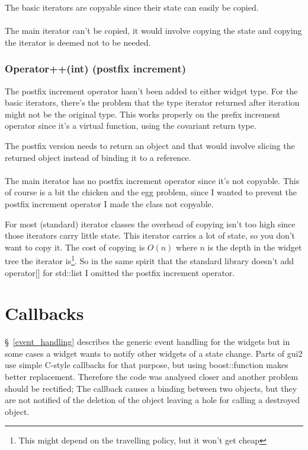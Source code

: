 \documentclass[a4paper,notitlepage,twocolumn,draft]{report}
\begin{document}
The basic iterators are copyable since their state can easily be copied.

\paragraph{}

The main iterator can't be copied, it would involve copying the state
and copying the iterator is deemed not to be needed.

\subsubsection{Operator++(int) (postfix increment)}

The postfix increment operator hasn't been added to either widget type. For the
basic iterators, there's the problem that the type iterator returned after
iteration might not be the original type. This works properly on the prefix
increment operator since it's a virtual function, using the covariant return
type.

The postfix version needs to return an object and that would involve slicing the
returned object instead of binding it to a reference.

\paragraph{}

The main iterator has no postfix increment operator since it's not copyable.
This of course is a bit the chicken and the egg problem, since I wanted to
prevent the postfix increment operator I made the class not copyable.

For most (standard) iterator classes the overhead of copying isn't too high
since those iterators carry little state.  This iterator carries a lot of state,
so you don't want to copy it. The cost of copying is $O(n)$ where $n$ is the
depth in the widget tree the iterator is\footnote{This might depend on the
travelling policy, but it won't get cheap}. So in the same spirit that the
standard library doesn't add operator[] for std::list I omitted the postfix
increment operator.


\section{Callbacks}

\S~\ref{event_handling} describes the generic event handling for the widgets but
in some cases a widget wants to notify other widgets of a state change. Parts of
gui2 use simple C-style callbacks for that purpose, but using boost::function
makes better replacement. Therefore the code was analysed closer and another
problem should be rectified; The callback causes a binding between two objects,
but they are not notified of the deletion of the object leaving a hole for
calling a destroyed object.
\end{document}
